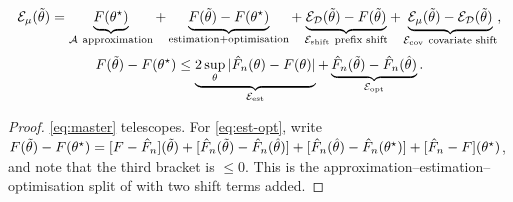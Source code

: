 \begin{theorem}\label{thm:master}
\Pv
\begin{equation}\label{eq:master}
\cE_\mu(\ttheta)=\underbrace{F(\theta^\star)}_{\cA\ \text{approximation}}
+\underbrace{F(\ttheta)-F(\theta^\star)}_{\text{estimation}+\text{optimisation}}
+\underbrace{\cE_\cD(\ttheta)-F(\ttheta)}_{\cE_{\mathrm{shift}}\ \text{prefix shift}}
+\underbrace{\cE_\mu(\ttheta)-\cE_\cD(\ttheta)}_{\cE_{\mathrm{cov}}\ \text{covariate shift}},
\end{equation}
\begin{equation}\label{eq:est-opt}
F(\tilde\theta)-F(\theta^\star)\le\underbrace{2\sup_{\theta}|\hat F_n(\theta)-F(\theta)|}_{\mathcal{E}_{\mathrm{est}}}
+\underbrace{\hat F_n(\tilde\theta)-\hat F_n(\hat\theta)}_{\mathcal{E}_{\mathrm{opt}}}.
\end{equation}
\end{theorem}
\begin{proof}
\eqref{eq:master} telescopes. For \eqref{eq:est-opt}, write
$F(\tilde\theta)-F(\theta^\star)=[F-\hat F_n](\tilde\theta)+[\hat F_n(\tilde\theta)-\hat F_n(\hat\theta)]+[\hat F_n(\hat\theta)-\hat F_n(\theta^\star)]+[\hat F_n-F](\theta^\star)$,
and note that the third bracket is $\le0$. This is the approximation--estimation--optimisation split of
\citet{bottou2008tradeoffs} with two shift terms added.
\end{proof}

